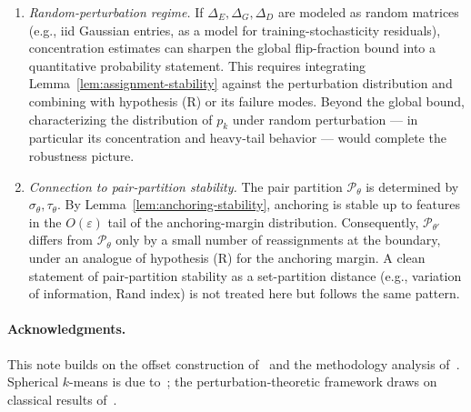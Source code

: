 \documentclass[11pt,letterpaper]{article}
\theoremstyle{definition}
\begin{document}
\begin{enumerate}[label=\arabic*., leftmargin=*, itemsep=1pt]
\item \emph{Random-perturbation regime.} If $\Delta_E, \Delta_G, \Delta_D$ are modeled as random matrices (e.g., iid Gaussian entries, as a model for training-stochasticity residuals), concentration estimates can sharpen the global flip-fraction bound into a quantitative probability statement. This requires integrating Lemma~\ref{lem:assignment-stability} against the perturbation distribution and combining with hypothesis (R) or its failure modes. Beyond the global bound, characterizing the distribution of $p_k$ under random perturbation --- in particular its concentration and heavy-tail behavior --- would complete the robustness picture.
\item \emph{Connection to pair-partition stability.} The pair partition $\mathcal{P}_\theta$ is determined by $\sigma_\theta, \tau_\theta$. By Lemma~\ref{lem:anchoring-stability}, anchoring is stable up to features in the $O(\varepsilon)$ tail of the anchoring-margin distribution. Consequently, $\mathcal{P}_{\theta'}$ differs from $\mathcal{P}_\theta$ only by a small number of reassignments at the boundary, under an analogue of hypothesis (R) for the anchoring margin. A clean statement of pair-partition stability as a set-partition distance (e.g., variation of information, Rand index) is not treated here but follows the same pattern.
\end{enumerate}

\paragraph{Acknowledgments.} This note builds on the offset construction of~\citep{hayuk_larql} and the methodology analysis of~\citep{cluster_size_confound}. Spherical $k$-means is due to~\citep{dhillon_modha_2001}; the perturbation-theoretic framework draws on classical results of~\citep{davis_kahan_1970, wedin_1972, stewart_sun_1990}.
\end{document}
